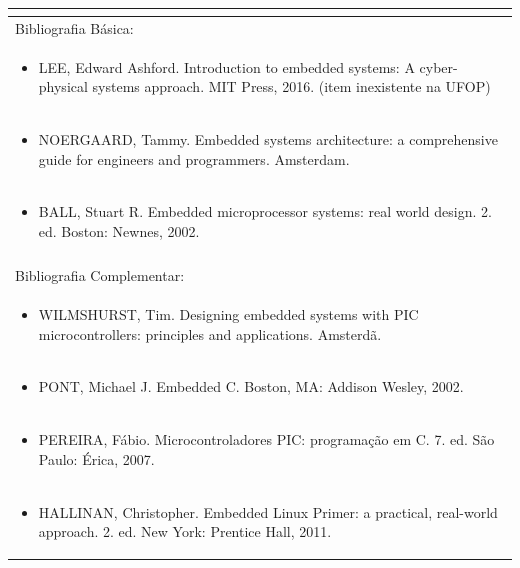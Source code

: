 \documentclass[11pt]{article}
\begin{document}
\begin{center}
\begin{longtable}{|p{4cm}|p{4cm}|p{4cm}|p{4cm}|}
\multicolumn{4}{|p{\dimexpr 16cm + 6\tabcolsep\relax}|}{}\\
\hline
\multicolumn{4}{|p{16cm}|}{Bibliografia Básica:}\\*
\multicolumn{4}{|p{\dimexpr 16cm + 6\tabcolsep\relax}|}{\begin{itemize}\item LEE, Edward Ashford. Introduction to embedded systems: A cyber-physical systems approach. MIT Press, 2016. (item inexistente na UFOP)\end{itemize}}\\
\multicolumn{4}{|p{\dimexpr 16cm + 6\tabcolsep\relax}|}{\begin{itemize}\item NOERGAARD, Tammy. Embedded systems architecture: a comprehensive guide for engineers and programmers. Amsterdam.\end{itemize}}\\
\multicolumn{4}{|p{\dimexpr 16cm + 6\tabcolsep\relax}|}{\begin{itemize}\item BALL, Stuart R. Embedded microprocessor systems: real world design. 2. ed. Boston: Newnes, 2002.\end{itemize}}\\
\multicolumn{4}{|p{16cm}|}{}\\
\hline
\multicolumn{4}{|p{16cm}|}{Bibliografia Complementar:}\\*
\multicolumn{4}{|p{\dimexpr 16cm + 6\tabcolsep\relax}|}{\begin{itemize}\item WILMSHURST, Tim. Designing embedded systems with PIC microcontrollers: principles and applications. Amsterdã.\end{itemize}}\\
\multicolumn{4}{|p{\dimexpr 16cm + 6\tabcolsep\relax}|}{\begin{itemize}\item PONT, Michael J. Embedded C. Boston, MA: Addison Wesley, 2002.\end{itemize}}\\
\multicolumn{4}{|p{\dimexpr 16cm + 6\tabcolsep\relax}|}{\begin{itemize}\item PEREIRA, Fábio. Microcontroladores PIC: programação em C. 7. ed. São Paulo: Érica, 2007.\end{itemize}}\\
\multicolumn{4}{|p{\dimexpr 16cm + 6\tabcolsep\relax}|}{\begin{itemize}\item HALLINAN, Christopher. Embedded Linux Primer: a practical, real-world approach. 2. ed. New York: Prentice Hall, 2011.\end{itemize}}\\

\end{longtable}
\end{center}
\end{document}
